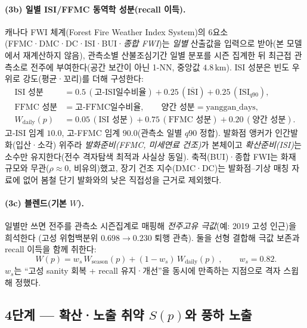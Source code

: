 \documentclass[11pt,a4paper]{article}
\begin{document}
\paragraph{(3b) 일별 ISI/FFMC 동역학 성분(recall 이득).}
캐나다 FWI 체계(Forest Fire Weather Index System)의 6요소(FFMC·DMC·DC·ISI·BUI·\emph{종합 FWI})는 \emph{일별} 산출값을 입력으로 받아(본 모델에서 재계산하지 않음), 관측소별 산불조심기간 일별 분포를 시즌 집계한 뒤 최근접 관측소로 전주에 부여한다(공간 보간이 아닌 1-NN, 중앙값 $4.8$\,km). ISI 성분은 빈도
우위로 강도(평균·꼬리)를 더해 구성한다:
\begin{align}
\text{ISI 성분}&=0.5\,(\text{고-ISI일수비율})+0.25\,(\overline{\text{ISI}})+0.25\,(\text{ISI}_{q90}),\\
\text{FFMC 성분}&=\text{고-FFMC일수비율},\qquad \text{양간 성분}=\mathrm{yanggan\_days},\\
W_{\text{daily}}(p)&=0.05\,(\text{ISI 성분})+0.75\,(\text{FFMC 성분})+0.20\,(\text{양간 성분}).
\label{eq:wdaily}
\end{align}
고-ISI 임계 $10.0$, 고-FFMC 임계 $90.0$(관측소 일별 $q90$ 정합). 발화점 앵커가 인간발화(입산·소각)
위주라 \emph{발화준비(FFMC, 미세연료 건조)}가 본체이고 \emph{확산준비(ISI)}는 소수만 유지한다(전수
격자탐색 최적과 사실상 동일). 축적(BUI)·종합 FWI는 화재 규모와 무관($\rho\!\approx\!0$, 비유의)했고, 장기 건조 지수(DMC·DC)는 발화점--기상 매칭 자료에 없어 봄철 단기 발화와의 낮은 직접성을 근거로 제외했다.

\paragraph{(3c) 블렌드(기본 $W$).}
일별만 쓰면 전주를 관측소 시즌집계로 매핑해 \emph{전주고유 극값}(예: 2019 고성 인근)을 희석한다
(고성 위험백분위 $0.698\!\to\!0.230$ 퇴행 관측). 둘을 선형 결합해 극값 보존과 recall 이득을 함께 취한다:
\begin{equation}
\boxed{\;W(p)=w_s\,W_{\text{season}}(p)+(1-w_s)\,W_{\text{daily}}(p)\;},\qquad w_s=0.82.
\label{eq:wblend}
\end{equation}
$w_s$는 ``고성 sanity 회복 + recall 유지·개선''을 동시에 만족하는 지점으로 격자 스윕해 정했다.

\subsection{4단계 — 확산·노출 취약 $S(p)$와 풍하 노출}\label{sec:exposure}
\end{document}
